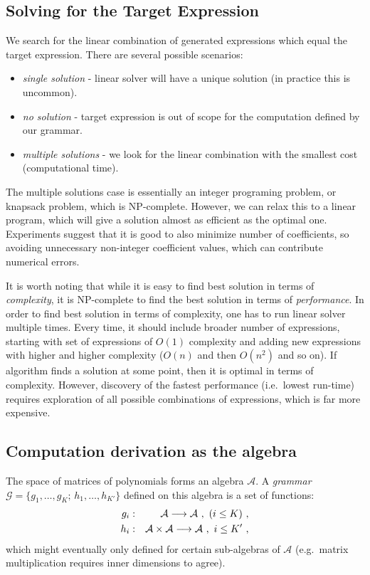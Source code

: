 \subsection{Solving for the Target Expression}
\label{sec:linear}

We search for the linear combination of generated expressions which equal the target expression. 
There are several possible scenarios:
\begin{itemize}
  \item \emph{single solution} - linear solver will have a unique solution (in practice
 this is uncommon).
 \item \emph{no solution} - target expression is out of scope for the computation defined by
our grammar. 
 \item  \emph{multiple solutions} - we look for the linear combination with the smallest cost
(computational time). 
\end{itemize}
The multiple solutions case is essentially an integer programing
problem, or knapsack problem, which is NP-complete. However, we can
relax this to a linear program, which will give a solution almost as
efficient as the optimal one. Experiments suggest that it is good to
also minimize number of coefficients, so avoiding unnecessary
non-integer coefficient values, which can contribute numerical errors.


It is worth noting that while it is easy to find best solution in
terms of {\em complexity}, it is NP-complete to find the best solution
in terms of {\em performance}. In order to find best solution in terms
of complexity, one has to run linear solver multiple times. Every
time, it should include broader number of expressions, starting with set
of expressions of $O(1)$ complexity and adding new expressions with higher and higher complexity
($O(n)$ and then $O(n^2)$ and so on). If algorithm finds a solution at
some point, then it is optimal in terms of complexity. 
However, discovery of the fastest performance (i.e.~lowest
run-time) requires exploration of all possible combinations of expressions,
which is far more expensive.  

\vspace{-2mm}

\subsection{Computation derivation as the algebra}
The space of matrices of polynomials forms an algebra $\mathcal{A}$.
A \emph{grammar} $\mathcal{G}=\{g_1,\dots,g_{K};\, h_1,\dots,
h_{K'}\}$ defined on this algebra is a set of functions:
\vspace{-1mm}
\begin{eqnarray}
g_i &:& \mathcal{A} \longrightarrow \mathcal{A}~,~(i \leq
K)~,\nonumber \\
h_{i} &:& \mathcal{A} \times \mathcal{A} \longrightarrow \mathcal{A}~,
~i \leq K'~,\nonumber 
 \vspace{-2mm} 
\end{eqnarray}
which might eventually only defined for certain sub-algebras of $\mathcal{A}$ 
(e.g.~matrix multiplication requires inner dimensions to agree). 

